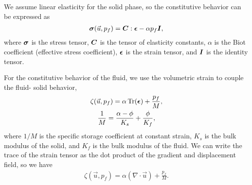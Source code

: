 We assume linear elasticity for the solid phase, so the constitutive behavior can be expressed 
as
\begin{gather}
  \bm{\sigma}(\vec{u},p_f) = \bm{C} : \bm{\epsilon} - \alpha p_f \bm{I},
\end{gather}
where $\bm{\sigma}$ is the stress tensor, $\bm{C}$ is the
tensor of elasticity constants, $\alpha$ is the Biot coefficient
(effective stress coefficient), $\bm{\epsilon}$ is the strain
tensor, and $\bm{I}$ is the identity tensor.

For the constitutive behavior of the fluid, we use the volumetric strain to couple the fluid-
solid behavior,
\begin{gather}
  \zeta(\vec{u},p_f) = \alpha \Tr({\tensor{\epsilon}}) + \frac{p_f}{M}, \\
%
  \frac{1}{M} = \frac{\alpha-\phi}{K_s} + \frac{\phi}{K_f},
\end{gather}
where $1/M$ is the specific storage coefficient at constant strain,
$K_s$ is the bulk modulus of the solid, and $K_f$ is the bulk modulus
of the fluid. We can write the trace of the strain tensor as the dot product of the gradient 
and displacement 
field, so we have
\begin{gather}
  \zeta(\vec{u},p_f) = \alpha (\nabla \cdot \vec{u}) + \frac{p_f}{M}.
\end{gather}

